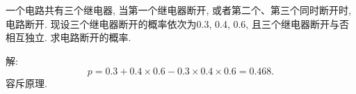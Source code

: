 \documentclass[standard]{ExBook}
\begin{document}
\begin{qitems}
\vspace{-5em}

    \begin{bbox}
    \begin{shaded}
        \qitem
一个电路共有三个继电器, 当第一个继电器断开, 或者第二个、第三个同时断开时, 电路断开. 现设三个继电器断开的概率依次为0.3, 0.4, 0.6, 且三个继电器断开与否相互独立. 求电路断开的概率.
    \end{shaded}
    \end{bbox}

\vspace{-5em}

    \begin{bbox}
解: 
$$p=0.3+0.4\times0.6-0.3\times0.4\times0.6=0.468.$$
\textcolor{themeColor}{\selectfont {} 容斥原理.}
    \end{bbox}
\end{qitems}


\section{}
\end{document}
